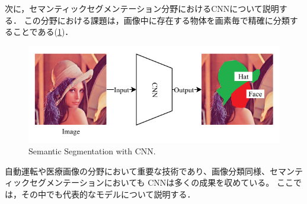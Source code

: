 次に，セマンティックセグメンテーション分野におけるCNNについて説明する．
この分野における課題は，画像中に存在する物体を画素毎で精確に分類することである(\ref{fig:semantic_segmentation})．
\begin{figure}[ht]
  \centering
  \includegraphics[width=16cm]{8_appendix/img/semantic_segmentation}
  \caption{Semantic Segmentation with CNN.}
  \label{fig:semantic_segmentation}
\end{figure}
自動運転や医療画像の分野において重要な技術であり、画像分類同様、セマンティックセグメンテーションにおいても CNNは多くの成果を収めている。
ここでは，その中でも代表的なモデルについて説明する．

